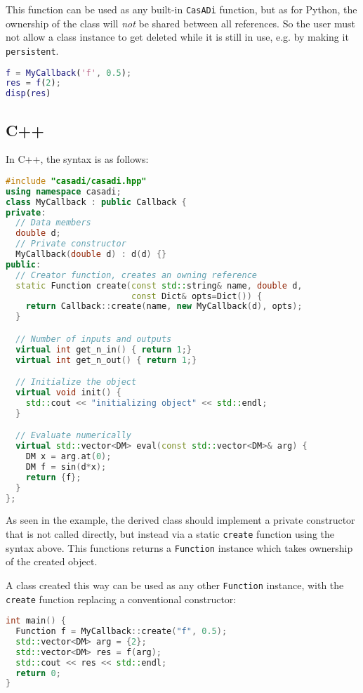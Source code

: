 \documentclass[a4paper,12pt]{book}
\newcommand{\CasADi}{\texttt{CasADi}\xspace}
\begin{document}
This function can be used as any built-in \CasADi function, but as for Python,
the ownership of the class will \emph{not} be shared between all references.
So the user must not allow a class instance to get deleted while it is still
in use, e.g. by making it \texttt{persistent}.

\begin{lstlisting}[language=Matlab]
% Use the function
f = MyCallback('f', 0.5);
res = f(2);
disp(res)
\end{lstlisting}

\subsection*{C++}
In C++, the syntax is as follows:
\begin{lstlisting}[language=C++]
#include "casadi/casadi.hpp"
using namespace casadi;
class MyCallback : public Callback {
private:
  // Data members
  double d;
  // Private constructor
  MyCallback(double d) : d(d) {}
public:
  // Creator function, creates an owning reference
  static Function create(const std::string& name, double d,
                         const Dict& opts=Dict()) {
    return Callback::create(name, new MyCallback(d), opts);
  }

  // Number of inputs and outputs
  virtual int get_n_in() { return 1;}
  virtual int get_n_out() { return 1;}

  // Initialize the object
  virtual void init() {
    std::cout << "initializing object" << std::endl;
  }

  // Evaluate numerically
  virtual std::vector<DM> eval(const std::vector<DM>& arg) {
    DM x = arg.at(0);
    DM f = sin(d*x);
    return {f};
  }
};
\end{lstlisting}

As seen in the example, the derived class should implement a private
constructor that is not called directly, but instead via a static \texttt{create}
function using the syntax above.
This functions returns a \texttt{Function} instance which takes ownership of the
created object.

A class created this way can be used as any other \texttt{Function} instance,
with the \texttt{create} function replacing a conventional constructor:

\begin{lstlisting}[language=C++]
int main() {
  Function f = MyCallback::create("f", 0.5);
  std::vector<DM> arg = {2};
  std::vector<DM> res = f(arg);
  std::cout << res << std::endl;
  return 0;
}
\end{lstlisting}
\end{document}
